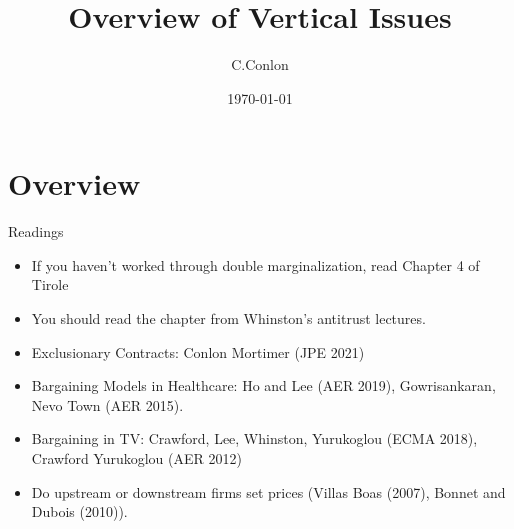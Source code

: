 \documentclass[aspectratio=169,11pt]{beamer}
\title [Vertical Models]{Overview of Vertical Issues}
\author{C.Conlon}
\institute{Grad IO}
\date{\today}
\begin{document}
\begin{frame}
\titlepage
\end{frame}




\section{Overview}


\begin{frame}{Readings}
\begin{itemize}
\item If you haven't worked through double marginalization, read Chapter 4 of Tirole
\item You should read the chapter from Whinston's antitrust lectures.
\item Exclusionary Contracts: Conlon Mortimer (JPE 2021)
\item Bargaining Models in Healthcare: Ho and Lee (AER 2019), Gowrisankaran, Nevo Town (AER 2015).
\item Bargaining in TV: Crawford, Lee, Whinston, Yurukoglou (ECMA 2018), Crawford Yurukoglou (AER 2012)
\item Do upstream or downstream firms set prices (Villas Boas (2007), Bonnet and Dubois (2010)).
\end{itemize}
\end{frame}

\end{document}
